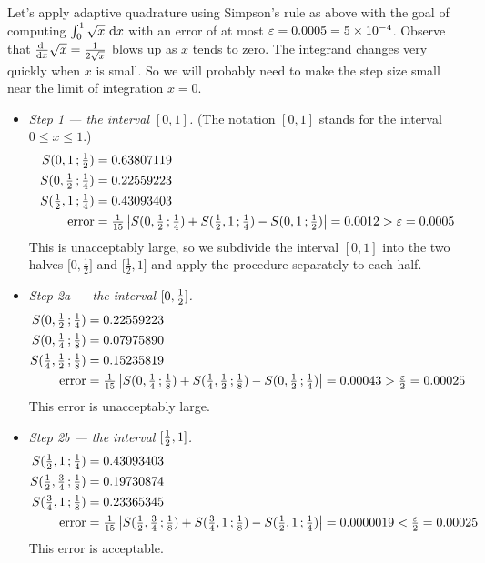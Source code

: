 \begin{eg}\label{eg:adaptiveQuad}
Let's apply adaptive quadrature using Simpson's rule as above with the
goal of computing $\int _0^1\sqrt{x}\ \mathrm{d}x$ with an error of at most
$\varepsilon=0.0005=5\times 10^{-4}$. Observe that 
$\diff{}{x}\sqrt{x}=\frac{1}{2\sqrt{x}}$ blows up as $x$ tends to zero. 
The integrand changes very quickly when $x$ is small. So we will probably need to make the step size small near the limit of integration $x=0$. 
\begin{itemize}
\item \emph{Step 1 --- the interval $[0,1]$.} (The notation $[0,1]$ stands
for the interval $0\le x\le 1$.)
\begin{align*}
S(0,1\,;\tfrac{1}{2})&= 0.63807119 \\
S(0,\tfrac{1}{2}\,;\tfrac{1}{4})&= 0.22559223 \\
S(\tfrac{1}{2},1\,;\tfrac{1}{4})&= 0.43093403  \\
\text{error}&=\tfrac{1}{15}\left|S(0,\tfrac{1}{2}\,;\tfrac{1}{4})
                              +S(\tfrac{1}{2},1\,;\tfrac{1}{4})
                              -S(0,1\,;\tfrac{1}{2})\right|
             =0.0012 >\varepsilon =0.0005
\end{align*}
This is unacceptably large, so we subdivide the interval $[0,1]$ into
the two halves $\big[0,\tfrac{1}{2}\big]$ and
$\big[\tfrac{1}{2},1\big]$ and apply
the procedure separately to each half.

\item \emph{Step 2a --- the interval $[0,\tfrac{1}{2}]$.}
\begin{align*}
S(0,\tfrac{1}{2}\,;\tfrac{1}{4})&= 0.22559223 \\
S(0,\tfrac{1}{4}\,;\tfrac{1}{8})&= 0.07975890 \\
S(\tfrac{1}{4},\tfrac{1}{2}\,;\tfrac{1}{8})&= 0.15235819 \\
\text{error}&=\tfrac{1}{15}\left|S(0,\tfrac{1}{4}\,;\tfrac{1}{8})
                              +S(\tfrac{1}{4},\tfrac{1}{2}\,;\tfrac{1}{8})
                              -S(0,\tfrac{1}{2}\,;\tfrac{1}{4})\right|
             = 0.00043  >\tfrac{\varepsilon}{2} = 0.00025
\end{align*}
This error is unacceptably large.


\item \emph{Step 2b --- the interval $[\tfrac{1}{2},1]$.}
\begin{align*}
S(\tfrac{1}{2},1\,;\tfrac{1}{4})&= 0.43093403 \\
S(\tfrac{1}{2},\tfrac{3}{4}\,;\tfrac{1}{8})&= 0.19730874 \\
S(\tfrac{3}{4},1\,;\tfrac{1}{8})&= 0.23365345  \\
\text{error}&=\tfrac{1}{15}\left|S(\tfrac{1}{2},\tfrac{3}{4}\,;\tfrac{1}{8})
                              +S(\tfrac{3}{4},1\,;\tfrac{1}{8})
                              -S(\tfrac{1}{2},1\,;\tfrac{1}{4})\right|
             = 0.0000019 <\tfrac{\varepsilon}{2} = 0.00025
\end{align*}
This error is acceptable.


\end{itemize}
\end{eg}
